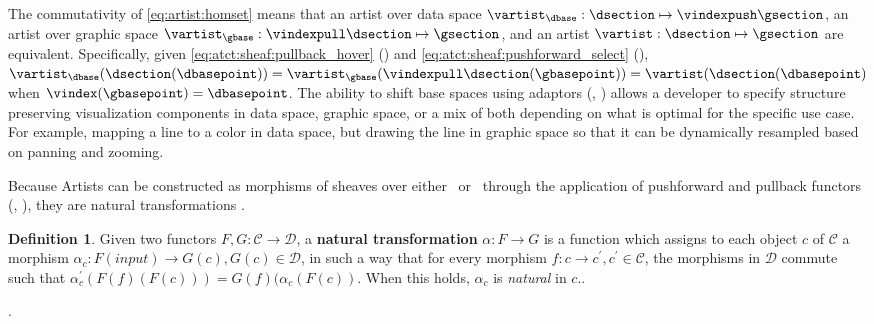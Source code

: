 \documentclass[journal]{IEEEtran}
\theoremstyle{definition}
\newtheorem{definition}{Definition}[section]
\theoremstyle{remark}
\begin{document}
The commutativity of \autoref{eq:artist:homset} means that an artist over data space $\vartist_{\dbase}: \dsection \mapsto \vindexpush \gsection$, an artist over graphic space $\vartist_{\gbase}: \vindexpull \dsection \mapsto \gsection$, and an artist $\vartist: \dsection \mapsto \gsection$ are equivalent. Specifically, given \autoref{eq:atct:sheaf:pullback_hover} (\vindexpull) and \autoref{eq:atct:sheaf:pushforward_select} (\vindexpush), $\vartist_{\dbase}(\dsection(\dbasepoint)) = \vartist_{\gbase}(\vindexpull\dsection(\gbasepoint)) = \vartist(\dsection(\dbasepoint)$ when $\vindex(\gbasepoint) = \dbasepoint$. The ability to shift base spaces using adaptors (\vindexpush, \vindexpull) allows a developer to specify structure preserving visualization components in data space, graphic space, or a mix of both depending on what is optimal for the specific use case. For example, mapping a line to a color in data space, but drawing the line in graphic space so that it can be dynamically resampled based on panning and zooming.

Because Artists can be constructed as morphisms of sheaves over either \dbase\ or \gbase\ through the application of pushforward and pullback functors (\vindexpush, \vindexpull), they are natural transformations \cite{bradleyWhatNaturalTransformation}.
\begin{definition}\label{def:natural-transform}
  Given two functors $F, G: \mathcal{C}\rightarrow \mathcal{D}$, a \textbf{natural transformation} $\alpha: F \rightarrow G$ is a function which assigns to each object $c$ of $\mathcal{C}$ a morphism $\alpha_c:F(input) \rightarrow G(c), G(c) \in \mathcal{D}$, in such a way that for every morphism $f:c \rightarrow c^\prime, c^\prime \in \mathcal{C}$, the morphisms in $\mathcal{D}$ commute such that $\alpha_c^{\prime}(F(f)(F(c))) = G(f)(\alpha_c(F(c))$. When this holds, $\alpha_{c}$ is \textit{natural} in $c$.\cite{maclaneCategoriesWorkingMathematician2013}.
\end{definition}.
\end{document}
